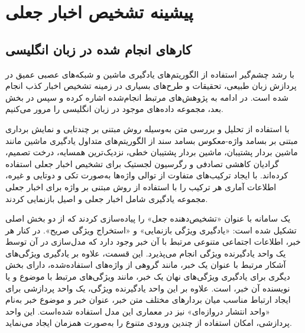 \chapter{پیشینه تشخیص اخبار جعلی}
\section{کارهای انجام شده در زبان انگلیسی}
با رشد چشم‌گیر استفاده از الگوریتم‌های یادگیری ماشین و شبکه‌های عصبی عمیق در پردازش زبان طبیعی، تحقیقات و طرح‌های بسیاری در زمینه تشخیص اخبار کذب انجام شده ‌است. در ادامه به پژوهش‌های مرتبط انجام‌شده اشاره کرده و سپس در بخش بعد، مجموعه داده‌های موجود در زبان انگلیسی را مرور می‌کنیم.

\citet{ahmed2017detection} با استفاده از تحلیل و بررسی متن به‌وسیله روش مبتنی ‌بر چندتایی و نمایش برداری مبتنی‌ بر بسامد واژه-معکوس بسامد سند از الگوریتم‌های متداول یادگیری ماشین مانند ماشین بردار پشتیبان، ماشین بردار پشتیبان خطی، نزدیک‌ترین همسایه، درخت تصمیم، گرادیان کاهشی تصادفی و رگرسیون لجستیک برای تشخیص اخبار جعلی استفاده کرده‌اند. با ایجاد ترکیب‌های متفاوت از توالی واژه‌ها به‌صورت تکی و دوتایی و غیره، اطلاعات آماری هر ترکیب را با استفاده از روش مبتنی‌ بر واژه برای اخبار جعلی مجموعه یادگیری شامل اخبار جعلی و اصیل بازنمایی کردند. %

\citet{zhang2020fakedetector}  یک سامانه با عنوان «تشخیص‌دهنده جعل» را پیاده‌سازی  کردند که از دو بخش اصلی تشکیل شده ‌است: «یادگیری ویژگی بازنمایی»   و «استخراج ویژگی صریح». در کنار هر خبر، اطلاعات اجتماعی متنوعی مرتبط با آن خبر وجود دارد که مدل‌سازی در آن توسط یک واحد یادگیرنده ویژگی انجام می‌پذیرد. این قسمت، علاوه بر یادگیری ویژگی‌های آشکار مرتبط با  عنوان یک خبر، مانند گروهی از واژه‌های استفاده‌شده، دارای بخش دیگری برای یادگیری ویژگی‌های نهان یک خبر، مانند ویژگی‌های مرتبط با موضوع و یا نویسنده آن خبر، است. علاوه بر این واحد یادگیرنده ویژگی، یک واحد پردازشی برای ایجاد ارتباط مناسب میان بردارهای مختلف متن خبر، عنوان خبر و موضوع خبر به‌نام «واحد انتشار دروازه‌ای» نیز در معماری این مدل استفاده شده‌است. این واحد پردازشی، امکان استفاده از چندین ورودی متنوع را به‌صورت همزمان ایجاد می‌نماید.

